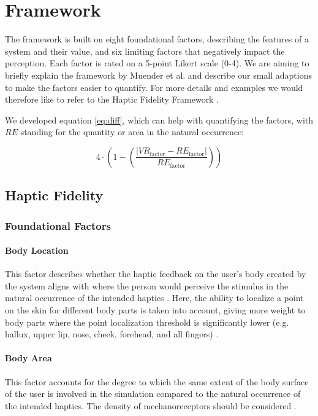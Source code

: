 \section{Framework}

The framework is built on eight foundational factors, describing the features of a system and their value, and six limiting factors that negatively impact the perception. Each factor is rated on a 5-point Likert scale (0-4). We are aiming to briefly explain the framework by Muender et al. and describe our small adaptions to make the factors easier to quantify. For more details and examples we would therefore like to refer to the Haptic Fidelity Framework \cite{Muender2022HapticReality}.

We developed equation \ref{eq:diff}, which can help with quantifying the factors, with $RE$ standing for the quantity or area in the natural occurrence:

\begin{equation}    
4 \cdot \left(1 - \left(\frac{\left|VR_{\text{factor}} - RE_{\text{factor}}\right|}{RE_{\text{factor}}}\right)\right)
\label{eq:diff}
\end{equation}


\subsection{Haptic Fidelity}
\subsubsection{Foundational Factors}
\paragraph{Body Location}

This factor describes whether the haptic feedback on the user's body created by the system aligns with where the person would perceive the stimulus in the natural occurrence of the intended haptics \cite{Muender2022HapticReality}. Here, the ability to localize a point on the skin for different body parts is taken into account, giving more weight to body parts where the point localization threshold is significantly lower (e.g. hallux, upper lip, nose, cheek, forehead, and all fingers) \cite{Lederman2009HapticTutorial}.

\paragraph{Body Area} 
This factor accounts for the degree to which the same extent of the body surface of the user is involved in the simulation compared to the natural occurrence of the intended haptics. The density of mechanoreceptors should be considered \cite{Muender2022HapticReality, Lederman2009HapticTutorial}.

